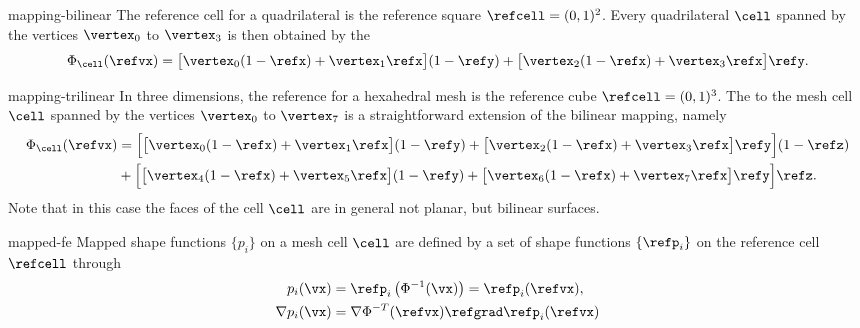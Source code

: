 \begin{Example}{mapping-bilinear}
  The reference cell for a quadrilateral is the reference square
  $\refcell = (0,1)^2$. Every quadrilateral $\cell$ spanned by the
  vertices $\vertex_0$ to $\vertex_3$ is then obtained by the
  \begin{gather}
    \Phi_\cell(\refvx)
    = \bigl[\vertex_0 (1-\refx)
    + \vertex_1 \refx\bigr] (1-\refy)
    + \bigl[\vertex_2 (1-\refx)
    + \vertex_3 \refx\bigr]\refy.
  \end{gather}
\end{Example}

\begin{Example}{mapping-trilinear}
  In three dimensions, the reference for a hexahedral mesh is the
  reference cube $\refcell = (0,1)^3$. The  to the mesh cell $\cell$ spanned by the vertices
  $\vertex_0$ to $\vertex_7$ is a straightforward extension of the
  bilinear mapping, namely
  \begin{gather}
    \begin{split}
      \Phi_\cell(\refvx)
      &= \Bigl[\bigl[\vertex_0 (1-\refx)
      + \vertex_1 \refx\bigr] (1-\refy)
      + \bigl[\vertex_2 (1-\refx)
      + \vertex_3 \refx\bigr]\refy\Bigr] (1-\refz)\\
      &+ \Bigl[\bigl[\vertex_4 (1-\refx)
      + \vertex_5 \refx\bigr] (1-\refy)
      + \bigl[\vertex_6 (1-\refx)
      + \vertex_7 \refx\bigr]\refy\Bigr] \refz.      
    \end{split}
  \end{gather}
  Note that in this case the faces of the cell $\cell$ are in general
  not planar, but bilinear surfaces.
\end{Example}

\begin{Definition}{mapped-fe}
  Mapped shape functions $\{p_i\}$ on a mesh cell $\cell$ are defined by a
  set of shape functions $\{\refp_i\}$ on the reference cell
  $\refcell$ through 
  \begin{gather}
    \begin{split}
      p_i(\vx) &= \refp_i\left(\Phi^{-1}(\vx)\right) = \refp_i(\refvx),\\
      \nabla p_i(\vx) &= \nabla\Phi^{-T}(\refvx)\refgrad\refp_i(\refvx)
    \end{split}
  \end{gather}
\end{Definition}

